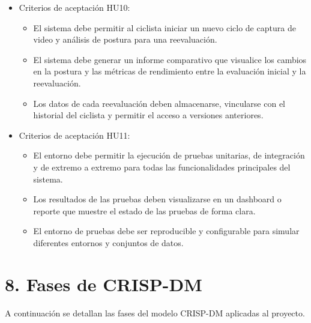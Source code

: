 \documentclass[
11pt, %
]{charter}
\begin{document}
\begin{itemize}
\begin{itemize}
      \item Criterios de aceptación HU10:
        \begin{itemize}
          \item El sistema debe permitir al ciclista iniciar un nuevo ciclo de captura de video y análisis de postura para una reevaluación.
          \item El sistema debe generar un informe comparativo que visualice los cambios en la postura y las métricas de rendimiento entre la evaluación inicial y la reevaluación.
          \item Los datos de cada reevaluación deben almacenarse, vincularse con el historial del ciclista y permitir el acceso a versiones anteriores.
        \end{itemize}
      \item Criterios de aceptación HU11:
        \begin{itemize}
          \item El entorno debe permitir la ejecución de pruebas unitarias, de integración y de extremo a extremo para todas las funcionalidades principales del sistema.
          \item Los resultados de las pruebas deben visualizarse en un dashboard o reporte que muestre el estado de las pruebas de forma clara.
          \item El entorno de pruebas debe ser reproducible y configurable para simular diferentes entornos y conjuntos de datos.
        \end{itemize}
    \end{itemize}
\end{itemize}

\section{8. Fases de CRISP-DM}
\label{sec:crisp}

A continuación se detallan las fases del modelo CRISP-DM aplicadas al proyecto.
\end{document}
